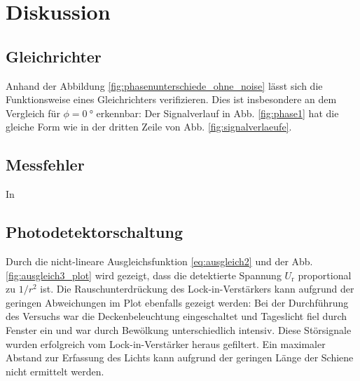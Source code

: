 \section{Diskussion}
\subsection{Gleichrichter}
Anhand der Abbildung \ref{fig:phasenunterschiede_ohne_noise} lässt sich die Funktionsweise eines Gleichrichters verifizieren.
Dies ist insbesondere an dem Vergleich für $\phi = \qty[]{0}{\degree}$ erkennbar:
Der Signalverlauf in Abb. \ref{fig:phase1} hat die gleiche Form wie in der dritten Zeile von Abb. \ref{fig:signalverlaeufe}.



\subsection{Messfehler}
In \refname{}

\subsection{Photodetektorschaltung}
Durch die nicht-lineare Ausgleichsfunktion \eqref{eq:ausgleich2} und der Abb. \ref{fig:ausgleich3_plot} wird gezeigt, 
dass die detektierte Spannung $U_\text{r}$ proportional zu $1/r^2$ ist.
Die Rauschunterdrückung des Lock-in-Verstärkers kann aufgrund der geringen Abweichungen im Plot ebenfalls gezeigt werden:
Bei der Durchführung des Versuchs war die Deckenbeleuchtung eingeschaltet und Tageslicht fiel durch Fenster ein und war durch Bewölkung unterschiedlich intensiv.
Diese Störsignale wurden erfolgreich vom Lock-in-Verstärker heraus gefiltert.
Ein maximaler Abstand zur Erfassung des Lichts kann aufgrund der geringen Länge der Schiene nicht ermittelt werden.